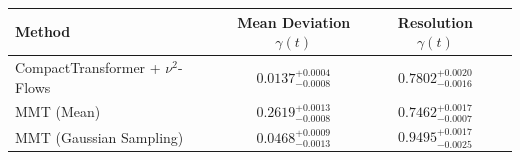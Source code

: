     \begin{tabular}{lccc}
        \toprule
        Method & Mean Deviation $\gamma(t)$ & Resolution $\gamma(t)$ \\
        \midrule
        CompactTransformer + $\nu^2$-Flows & $0.0137^{+0.0004}_{-0.0008}$ & $0.7802^{+0.0020}_{-0.0016}$ \\
        MMT (Mean) & $0.2619^{+0.0013}_{-0.0008}$ & $0.7462^{+0.0017}_{-0.0007}$ \\
        MMT (Gaussian Sampling) & $0.0468^{+0.0009}_{-0.0013}$ & $0.9495^{+0.0017}_{-0.0025}$ \\
        \bottomrule
    \end{tabular}